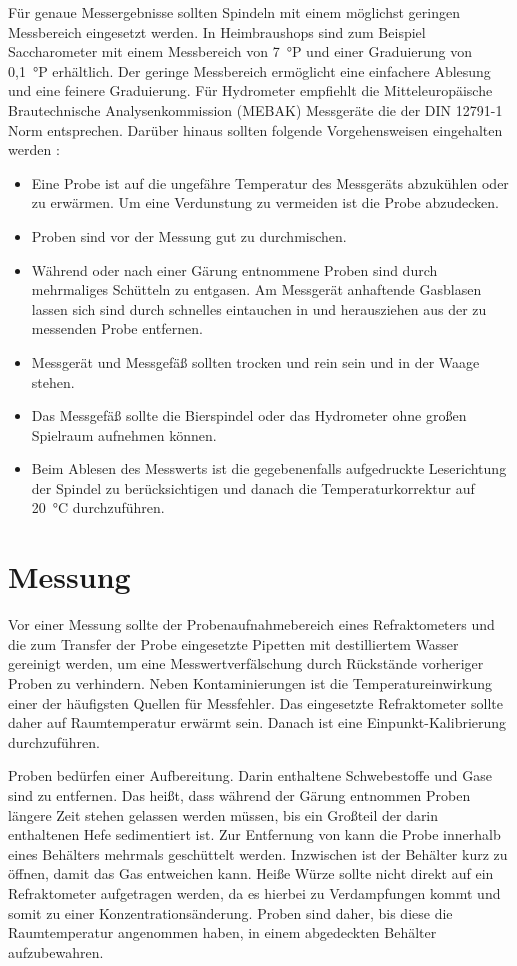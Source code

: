 \documentclass[a4paper,parskip=half]{scrartcl}
\begin{document}
Für genaue Messergebnisse sollten Spindeln mit einem möglichst
geringen Messbereich eingesetzt werden. In Heimbraushops sind
zum Beispiel Saccharometer mit einem Messbereich von 7~°P
und einer Graduierung von 0,1~°P erhältlich. Der geringe Messbereich
ermöglicht eine einfachere Ablesung und eine feinere Graduierung.
Für Hydrometer empfiehlt die Mitteleuropäische Brautechnische
Analysenkommission (MEBAK) Messgeräte die der DIN 12791-1 Norm
entsprechen. Darüber hinaus sollten folgende Vorgehensweisen
eingehalten werden \parencites[143]{MEBAK2013}[647\psq]{Narziss2009}{Wolf2015}:

\begin{itemize}
\item Eine Probe ist auf die ungefähre Temperatur des
Messgeräts abzukühlen oder zu erwärmen. Um eine Verdunstung
zu vermeiden ist die Probe abzudecken.
\item Proben sind vor der Messung gut zu durchmischen.
\item Während oder nach einer Gärung entnommene Proben sind
durch mehrmaliges Schütteln zu entgasen. Am Messgerät
anhaftende Gasblasen lassen sich sind durch schnelles eintauchen
in und herausziehen aus der zu messenden Probe entfernen.
\item Messgerät und Messgefäß sollten trocken und rein sein
und in der Waage stehen.
\item Das Messgefäß sollte die Bierspindel oder das Hydrometer
ohne großen Spielraum aufnehmen können.
\item Beim Ablesen des Messwerts ist die gegebenenfalls aufgedruckte
Leserichtung der Spindel zu berücksichtigen und danach die
Temperaturkorrektur auf 20~°C durchzuführen.
\end{itemize}

\section*{Messung}

Vor einer Messung sollte der Probenaufnahmebereich eines Refraktometers
und die zum Transfer der Probe eingesetzte Pipetten mit destilliertem Wasser
gereinigt werden, um eine Messwertverfälschung durch Rückstände vorheriger
Proben zu verhindern. Neben Kontaminierungen ist die Temperatureinwirkung
einer der häufigsten Quellen für Messfehler. Das eingesetzte Refraktometer
sollte daher auf Raumtemperatur erwärmt sein. Danach ist eine 
Einpunkt-Kalibrierung durchzuführen. \parencite{Depalma2017}

Proben bedürfen einer Aufbereitung. Darin enthaltene Schwebestoffe und
Gase sind zu entfernen. Das heißt, dass
während der Gärung entnommen Proben längere Zeit stehen gelassen werden
müssen, bis ein Großteil der darin enthaltenen Hefe sedimentiert
ist. Zur Entfernung von  kann die Probe innerhalb eines
Behälters mehrmals geschüttelt werden. Inzwischen ist der Behälter
kurz zu öffnen, damit das Gas entweichen kann. Heiße Würze
sollte nicht direkt auf ein Refraktometer aufgetragen werden,
da es hierbei zu Verdampfungen kommt und somit zu einer
Konzentrationsänderung. Proben sind daher,
bis diese die Raumtemperatur angenommen haben, in einem abgedeckten
Behälter aufzubewahren. \parencites[105]{Gamer1959}[140\psq,150\psq]{MEBAK2013}[51\psq]{Terrill2013}
\end{document}
